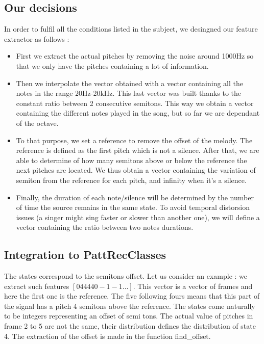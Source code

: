 \documentclass[a4paper]{report}
\begin{document}
\subsection{Our decisions}
In order to fulfil all the conditions listed in the subject, we desingned our feature extractor as follows :
\begin{itemize}
\item First we extract the actual pitches by removing the noise around 1000Hz so that we only have the pitches containing a lot of information.

\item Then we interpolate the vector obtained with a vector containing all the notes in the range 20Hz-20kHz. This last vector was built thanks to the constant ratio between 2 consecutive semitons. This way we obtain a vector containing the different notes played in the song, but so far we are dependant of the octave.

\item To that purpose, we set a reference to remove the offset of the melody. The reference is defined as the first pitch which is not a silence. After that, we are able to determine of how many semitons above or below the reference the next pitches are located. We thus obtain a vector containing the variation of semiton from the reference for each pitch, and infinity when it's a silence.

\item Finally, the duration of each note/silence will be determined by the number of time the source remains in the same state. To avoid temporal distorsion issues (a singer might sing faster or slower than another one), we will define a vector containing the ratio between two notes durations.
\end{itemize}

\subsection{Integration to PattRecClasses}
The states correspond to the semitons offset. Let us consider an example : we extract such features $[0 4 4 4 4 0 -1 -1 \dots]$. This vector is a vector of frames and here the first one is the reference. The five following fours means that this part of the signal has a pitch 4 semitons above the reference. The states come naturally to be integers representing an offset of semi tons. The actual value of pitches in frame 2 to 5 are not the same, their distribution defines the distribution of state 4.
The extraction of the offset is made in the function find\_offset.
\end{document}
